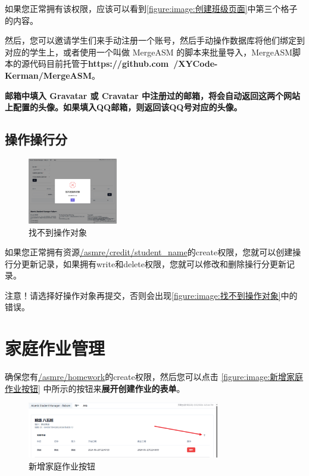 \documentclass[lang=cn]{elegantpaper}
\begin{document}
        如果您正常拥有该权限，应该可以看到\autoref{figure:image:创建班级页面}中第三个格子的内容。

        然后，您可以邀请学生们来手动注册一个账号，然后手动操作数据库将他们绑定到对应的学生上，或者使用一个叫做 MergeASM 的脚本来批量导入，MergeASM脚本的源代码目前托管于\textbf{https://github.com~/XYCode-Kerman/MergeASM}。

        \vspace{0.25cm}

        \textbf{
            邮箱中填入 Gravatar 或 Cravatar 中注册过的邮箱，将会自动返回这两个网站上配置的头像。如果填入QQ邮箱，则返回该QQ号对应的头像。
        }

    \subsection{操作操行分}
        \begin{figure}
            \centering
            \includegraphics[width=0.35\textwidth]{figure/images/object-not-found.png}
            \caption{找不到操作对象}\label{figure:image:找不到操作对象}
        \end{figure}

        如果您正常拥有资源\uline{/asmre/credit/student\_name}的create权限，您就可以创建操行分更新记录，如果拥有write和delete权限，您就可以修改和删除操行分更新记录。

        注意！请选择好操作对象再提交，否则会出现\autoref{figure:image:找不到操作对象}中的错误。

\section{家庭作业管理}
    \label{section:家庭作业管理}

    确保您有\uline{/asmre/homework}的create权限，然后您可以点击 \autoref{figure:image:新增家庭作业按钮} 中所示的按钮来\textbf{展开创建作业的表单}。

    \begin{figure}[htbp]
        \centering
        \includegraphics[width=0.75\textwidth]{figure/images/add-homework-btn.png}
        \caption{新增家庭作业按钮}\label{figure:image:新增家庭作业按钮}
    \end{figure}
\end{document}
